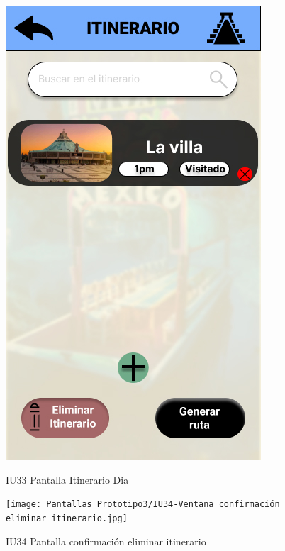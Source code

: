 \begin{figure}[h]
    \begin{minipage}{0.5\textwidth}
        \centering
        \includegraphics[width=.7\linewidth]{Pantallas Prototipo3/IU33 Pantalla Itinerario Dia.jpg}
        \caption{IU33 Pantalla Itinerario Dia}
    \end{minipage}
    \begin{minipage}{0.5\textwidth}
        \centering
        \texttt{[image: Pantallas Prototipo3/IU34-Ventana confirmación eliminar itinerario.jpg]}
        \caption{IU34 Pantalla confirmación eliminar itinerario}
    \end{minipage}%
\end{figure}

